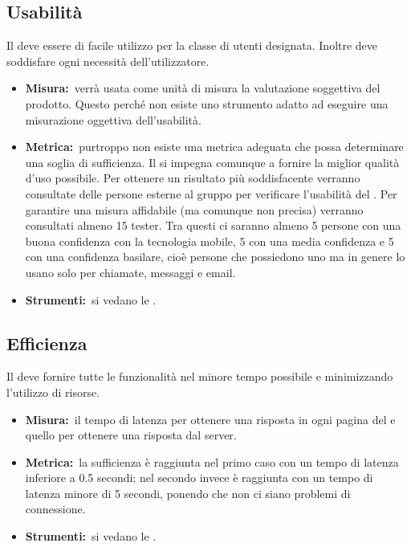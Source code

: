 	\subsection{Usabilità}
		Il  deve essere di facile utilizzo per la classe di utenti designata. Inoltre deve soddisfare ogni necessità dell'utilizzatore.
		\begin{itemize}
			\item \textbf{Misura:}\ verrà usata come unità di misura la valutazione soggettiva del prodotto. Questo perché non esiste uno strumento adatto ad eseguire una misurazione oggettiva dell'usabilità.
			\item \textbf{Metrica:}\ purtroppo non esiste una metrica adeguata che possa determinare una soglia di sufficienza. Il  si impegna comunque a fornire la miglior qualità d'uso possibile. Per ottenere un risultato più soddisfacente verranno consultate delle persone esterne al gruppo per verificare l'usabilità del . Per garantire una misura affidabile (ma comunque non precisa) verranno consultati almeno 15 tester. Tra questi ci saranno almeno 5 persone con una buona confidenza con la tecnologia mobile, 5 con una media confidenza e 5 con una confidenza basilare, cioè persone che possiedono uno  ma in genere lo usano solo per chiamate, messaggi e email.
			\item \textbf{Strumenti:}\ si vedano le \NPdoc.
		\end{itemize}
	\subsection{Efficienza}
		Il  deve fornire tutte le funzionalità nel minore tempo possibile e minimizzando l'utilizzo di risorse.
		\begin{itemize}
			\item \textbf{Misura:}\ il tempo di latenza per ottenere una risposta in ogni pagina del  e quello per ottenere una risposta dal server.
			\item \textbf{Metrica:}\ la sufficienza è raggiunta nel primo caso con un tempo di latenza inferiore a 0.5 secondi; nel secondo invece è raggiunta con un tempo di latenza minore di 5 secondi, ponendo che non ci siano problemi di connessione.
			\item \textbf{Strumenti:}\ si vedano le \NPdoc.
		\end{itemize}
